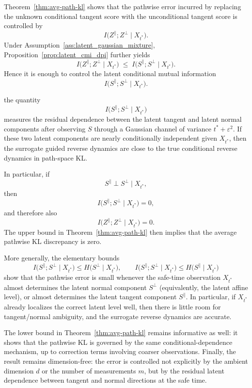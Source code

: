 \documentclass[twoside,11pt]{article}
\numberwithin{equation}{section}
\begin{document}
\begin{remark}
\label{rem:pathwise_latent_interpretation}
Theorem~\ref{thm:avg-path-kl} shows that the pathwise error incurred by replacing the
unknown conditional tangent score with the unconditional tangent score is controlled by
\[
I\!\big(Z^\parallel;Z^\perp\mid X_{t^*}\big).
\]
Under Assumption~\ref{ass:latent_gaussian_mixture}, Proposition~\ref{prop:latent_cmi_dpi}
further yields
\[
I\!\big(Z^\parallel;Z^\perp\mid X_{t^*}\big)
\;\le\;
I\!\big(S^\parallel;S^\perp\mid X_{t^*}\big).
\]
Hence it is enough to control the latent conditional mutual information
\[
I\!\big(S^\parallel;S^\perp\mid X_{t^*}\big).
\]

the quantity
\[
I\!\big(S^\parallel;S^\perp\mid X_{t^*}\big)
\]
measures the residual dependence between the latent tangent and latent normal components
after observing \(S\) through a Gaussian channel of variance \(t^*+\varepsilon^2\). If
these two latent components are nearly conditionally independent given \(X_{t^*}\), then
the surrogate guided reverse dynamics are close to the true conditional reverse dynamics
in path-space KL.

In particular, if
\[
S^\parallel \perp S^\perp \mid X_{t^*},
\]
then
\[
I\!\big(S^\parallel;S^\perp\mid X_{t^*}\big)=0,
\]
and therefore also
\[
I\!\big(Z^\parallel;Z^\perp\mid X_{t^*}\big)=0.
\]
The upper bound in Theorem~\ref{thm:avg-path-kl} then implies that the average pathwise
KL discrepancy is zero.

More generally, the elementary bounds
\[
I\!\big(S^\parallel;S^\perp\mid X_{t^*}\big)
\le H\!\big(S^\perp\mid X_{t^*}\big),
\qquad
I\!\big(S^\parallel;S^\perp\mid X_{t^*}\big)
\le H\!\big(S^\parallel\mid X_{t^*}\big)
\]
show that the pathwise error is small whenever the safe-time observation \(X_{t^*}\)
almost determines the latent normal component \(S^\perp\) (equivalently, the latent affine
level), or almost determines the latent tangent component \(S^\parallel\). In particular,
if \(X_{t^*}\) already localizes the correct latent level well, then there is little room
for tangent/normal ambiguity, and the surrogate reverse dynamics are accurate.

The lower bound in Theorem~\ref{thm:avg-path-kl} remains informative as well: it shows that
the pathwise KL is governed by the same conditional-dependence mechanism, up to correction
terms involving coarser observations. Finally, the result remains dimension-free: the error
is controlled not explicitly by the ambient dimension \(d\) or the number of measurements
\(m\), but by the residual latent dependence between tangent and normal directions at the
safe time.
\end{remark}
\medskip
\end{document}

